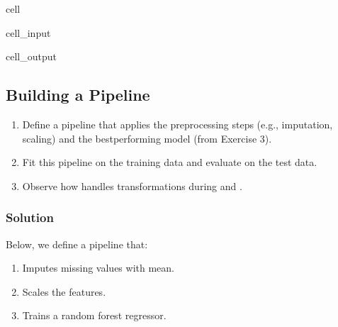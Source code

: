 \documentclass[letterpaper,10pt,english]{jupyterBook}
\begin{document}
\begin{sphinxuseclass}{cell}
\begin{sphinxVerbatimInput}
\begin{sphinxuseclass}{cell_input}
\end{sphinxuseclass}\end{sphinxVerbatimInput}
\begin{sphinxVerbatimOutput}

\begin{sphinxuseclass}{cell_output}
\noindent{}

\end{sphinxuseclass}\end{sphinxVerbatimOutput}

\end{sphinxuseclass}

\subsection{Building a Pipeline}
\label{\detokenize{03:building-a-pipeline}}\begin{enumerate}
%
\item {} 
\sphinxAtStartPar
Define a pipeline that applies the preprocessing steps (e.g., imputation, scaling) and the best\sphinxhyphen{}performing model (from Exercise 3).

\item {} 
\sphinxAtStartPar
Fit this pipeline on the training data and evaluate on the test data.

\item {} 
\sphinxAtStartPar
Observe how  handles transformations during  and .

\end{enumerate}


\subsubsection{Solution}
\label{\detokenize{03:id5}}
\sphinxAtStartPar
Below, we define a pipeline that:
\begin{enumerate}
%
\item {} 
\sphinxAtStartPar
Imputes missing values with mean.

\item {} 
\sphinxAtStartPar
Scales the features.

\item {} 
\sphinxAtStartPar
Trains a random forest regressor.

\end{enumerate}
\end{document}
